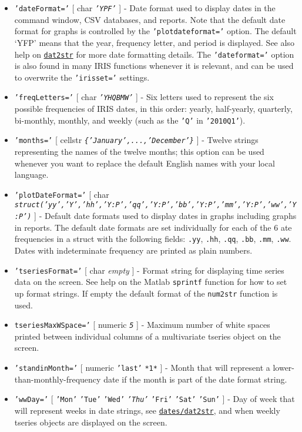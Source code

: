 \begin{itemize}
\item
  \texttt{'dateFormat='} {[} char \textbar{} \emph{\texttt{'YPF'}} {]} -
  Date format used to display dates in the command window, CSV
  databases, and reports. Note that the default date format for graphs
  is controlled by the \texttt{'plotdateformat='} option. The default
  `YFP' means that the year, frequency letter, and period is displayed.
  See also help on \href{dates/dat2str}{\texttt{dat2str}} for more date
  formatting details. The \texttt{'dateformat='} option is also found in
  many IRIS functions whenever it is relevant, and can be used to
  overwrite the \texttt{'irisset='} settings.
\item
  \texttt{'freqLetters='} {[} char \textbar{} \emph{\texttt{'YHQBMW'}}
  {]} - Six letters used to represent the six possible frequencies of
  IRIS dates, in this order: yearly, half-yearly, quarterly, bi-monthly,
  monthly, and weekly (such as the \texttt{'Q'} in \texttt{'2010Q1'}).
\item
  \texttt{'months='} {[} cellstr \textbar{}
  \emph{\texttt{\{'January',...,'December'\}}} {]} - Twelve strings
  representing the names of the twelve months; this option can be used
  whenever you want to replace the default English names with your local
  language.
\item
  \texttt{'plotDateFormat='} {[} char \textbar{}
  \emph{\texttt{struct('yy','Y','hh','Y:P','qq','Y:P','bb','Y:P','mm','Y:P','ww','Y:P')}}
  {]} - Default date formats used to display dates in graphs including
  graphs in reports. The default date formats are set individually for
  each of the 6 ate frequencies in a struct with the following fields:
  \texttt{.yy}, \texttt{.hh}, \texttt{.qq}, \texttt{.bb}, \texttt{.mm},
  \texttt{.ww}. Dates with indeterminate frequency are printed as plain
  numbers.
\item
  \texttt{'tseriesFormat='} {[} char \textbar{} \emph{empty} {]} -
  Format string for displaying time series data on the screen. See help
  on the Matlab \texttt{sprintf} function for how to set up format
  strings. If empty the default format of the \texttt{num2str} function
  is used.
\item
  \texttt{tseriesMaxWSpace='} {[} numeric \textbar{} \emph{\texttt{5}}
  {]} - Maximum number of white spaces printed between individual
  columns of a multivariate tseries object on the screen.
\item
  \texttt{'standinMonth='} {[} numeric \textbar{} \texttt{'last'}
  \textbar{} \texttt{*1*} {]} - Month that will represent a
  lower-than-monthly-frequency date if the month is part of the date
  format string.
\item
  \texttt{'wwDay='} {[} \texttt{'Mon'} \textbar{} \texttt{'Tue'}
  \textbar{} \texttt{'Wed'} \textbar{} \emph{\texttt{'Thu'}} \textbar{}
  \texttt{'Fri'} \textbar{} \texttt{'Sat'} \textbar{} \texttt{'Sun'} {]}
  - Day of week that will represent weeks in date strings, see
  \href{dates/dat2str}{\texttt{dates/dat2str}}, and when weekly tseries
  objects are displayed on the screen.
\end{itemize}

